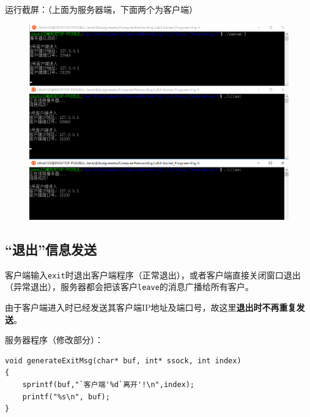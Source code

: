 \documentclass[logo,reportComp]{thesis}
\begin{document}
运行截屏：（上面为服务器端，下面两个为客户端）
\begin{figure}[H]
\centering
\includegraphics[width=\linewidth]{fig/p3.PNG}
\end{figure}

\subsection{``退出''信息发送}
客户端输入\verb'exit'时退出客户端程序（正常退出），或者客户端直接关闭窗口退出（异常退出），服务器都会把该客户\verb'leave'的消息广播给所有客户。

由于客户端进入时已经发送其客户端IP地址及端口号，故这里\textbf{退出时不再重复发送}。

服务器程序（修改部分）：
\begin{lstlisting}
void generateExitMsg(char* buf, int* ssock, int index)
{
    sprintf(buf,"`客户端'%d`离开'!\n",index);
    printf("%s\n", buf);
}
\end{lstlisting}
\end{document}
